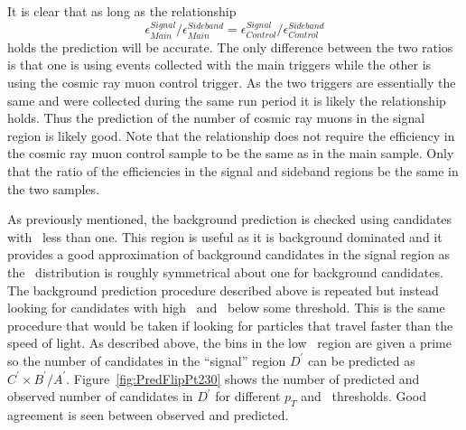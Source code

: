 It is clear that as long as the relationship
\begin{equation}
\epsilon_{Main}^{Signal}/ \epsilon_{Main}^{Sideband} = \epsilon_{Control}^{Signal} / \epsilon_{Control}^{Sideband}
\label{eq:ReducedCosmicPredRatio}
\end{equation}
holds the prediction will be accurate. The only difference between the two ratios is that one is using events collected with the main triggers while the
other is using the cosmic ray muon control trigger. As the two triggers are essentially the same and were collected during the same run period it is likely the
relationship holds. Thus the prediction of the number of cosmic ray muons in the signal region is likely good. Note that the relationship does not require the efficiency
in the cosmic ray muon control sample to be the same as in the main sample. Only that the ratio of the efficiencies in the signal and sideband regions
be the same in the two samples.

As previously mentioned, the background prediction is checked using candidates with \invbeta\ less than one. This region is useful as it is background dominated
and it provides a good approximation of background candidates in the signal region as the \invbeta\ distribution is roughly symmetrical about one for background candidates.
The background prediction procedure described above is repeated but instead looking for candidates with high \pt\ and \invbeta\ below some threshold.
This is the same procedure that would be taken if looking for particles that travel faster than the speed of light.
As described above, the bins in the low \invbeta\ region are given a prime so the number of candidates in the ``signal'' region $D^{\prime}$ can be predicted as
$C^{\prime} \times B^{\prime}/A^{\prime}$. Figure~\ref{fig:PredFlipPt230} shows the number of predicted and observed number of candidates in $D^{\prime}$ for different $p_T$
and \invbeta\ thresholds. Good agreement is seen between observed and predicted. 

